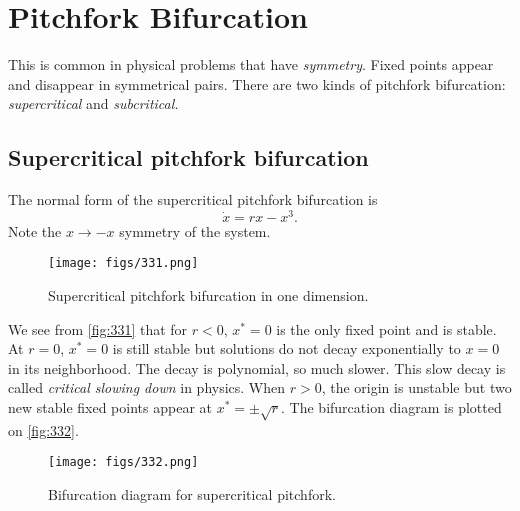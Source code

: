 \documentclass[oneside]{book}
\begin{document}
\section{Pitchfork Bifurcation}
This is common in physical problems that have \textit{symmetry}. Fixed points appear and disappear in symmetrical pairs. There are two kinds of pitchfork bifurcation: \textit{supercritical} and \textit{subcritical.}
\subsection{Supercritical pitchfork bifurcation}
The normal form of the supercritical pitchfork bifurcation is
\begin{equation} \label{eq:331}
	\dot{x} = rx - x^3.
\end{equation}
Note the $ x \to - x $ symmetry of the system.
\begin{figure}[h]
	\centering
	\texttt{[image: figs/331.png]}
	\caption{Supercritical pitchfork bifurcation in one dimension.}
	\label{fig:331}
\end{figure}
\par
We see from \autoref{fig:331} that for $ r < 0 $, $ x^* = 0 $ is the only fixed point and is stable. At $ r = 0 $, $ x^* = 0 $ is still stable but solutions do not decay exponentially to $ x = 0 $ in its neighborhood. The decay is polynomial, so much slower. This slow decay is called \textit{critical slowing down} in physics. When $ r > 0 $, the origin is unstable but two new stable fixed points appear at $ x^* = \pm \sqrt{r} $. The bifurcation diagram is plotted on \autoref{fig:332}.
\begin{figure}[h]
	\centering
	\texttt{[image: figs/332.png]}
	\caption{Bifurcation diagram for supercritical pitchfork.}
	\label{fig:332}
\end{figure}
\\\\
\end{document}
